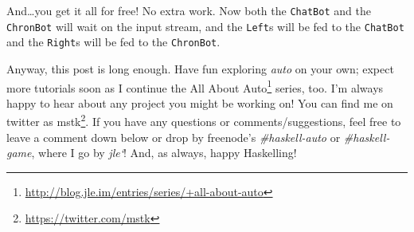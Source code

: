 \documentclass[]{article}
\renewcommand{\href}[2]{#2\footnote{\url{#1}}}
\begin{document}
And\ldots{}you get it all for free! No extra work. Now both the \texttt{ChatBot}
and the \texttt{ChronBot} will wait on the input stream, and the \texttt{Left}s
will be fed to the \texttt{ChatBot} and the \texttt{Right}s will be fed to the
\texttt{ChronBot}.

Anyway, this post is long enough. Have fun exploring \emph{auto} on your own;
expect more tutorials soon as I continue the
\href{http://blog.jle.im/entries/series/+all-about-auto}{All About Auto} series,
too. I'm always happy to hear about any project you might be working on! You can
find me on twitter as \href{https://twitter.com/mstk}{mstk}. If you have any
questions or comments/suggestions, feel free to leave a comment down below or
drop by freenode's \emph{\#haskell-auto} or \emph{\#haskell-game}, where I go by
\emph{jle`}! And, as always, happy Haskelling!
\end{document}
